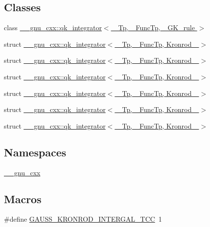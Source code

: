 \subsection*{Classes}
\begin{DoxyCompactItemize}
\item 
class \hyperlink{class____gnu__cxx_1_1qk__integrator}{\+\_\+\+\_\+gnu\+\_\+cxx\+::qk\+\_\+integrator$<$ \+\_\+\+Tp, \+\_\+\+Func\+Tp, \+\_\+\+G\+K\+\_\+rule $>$}
\item 
struct \hyperlink{struct____gnu__cxx_1_1qk__integrator_3_01__Tp_00_01__FuncTp_00_01Kronrod__15_01_4}{\+\_\+\+\_\+gnu\+\_\+cxx\+::qk\+\_\+integrator$<$ \+\_\+\+Tp, \+\_\+\+Func\+Tp, Kronrod\+\_ $>$}
\item 
struct \hyperlink{struct____gnu__cxx_1_1qk__integrator_3_01__Tp_00_01__FuncTp_00_01Kronrod__21_01_4}{\+\_\+\+\_\+gnu\+\_\+cxx\+::qk\+\_\+integrator$<$ \+\_\+\+Tp, \+\_\+\+Func\+Tp, Kronrod\+\_ $>$}
\item 
struct \hyperlink{struct____gnu__cxx_1_1qk__integrator_3_01__Tp_00_01__FuncTp_00_01Kronrod__31_01_4}{\+\_\+\+\_\+gnu\+\_\+cxx\+::qk\+\_\+integrator$<$ \+\_\+\+Tp, \+\_\+\+Func\+Tp, Kronrod\+\_ $>$}
\item 
struct \hyperlink{struct____gnu__cxx_1_1qk__integrator_3_01__Tp_00_01__FuncTp_00_01Kronrod__41_01_4}{\+\_\+\+\_\+gnu\+\_\+cxx\+::qk\+\_\+integrator$<$ \+\_\+\+Tp, \+\_\+\+Func\+Tp, Kronrod\+\_ $>$}
\item 
struct \hyperlink{struct____gnu__cxx_1_1qk__integrator_3_01__Tp_00_01__FuncTp_00_01Kronrod__51_01_4}{\+\_\+\+\_\+gnu\+\_\+cxx\+::qk\+\_\+integrator$<$ \+\_\+\+Tp, \+\_\+\+Func\+Tp, Kronrod\+\_ $>$}
\item 
struct \hyperlink{struct____gnu__cxx_1_1qk__integrator_3_01__Tp_00_01__FuncTp_00_01Kronrod__61_01_4}{\+\_\+\+\_\+gnu\+\_\+cxx\+::qk\+\_\+integrator$<$ \+\_\+\+Tp, \+\_\+\+Func\+Tp, Kronrod\+\_ $>$}
\end{DoxyCompactItemize}
\subsection*{Namespaces}
\begin{DoxyCompactItemize}
\item 
 \hyperlink{namespace____gnu__cxx}{\+\_\+\+\_\+gnu\+\_\+cxx}
\end{DoxyCompactItemize}
\subsection*{Macros}
\begin{DoxyCompactItemize}
\item 
\#define \hyperlink{gauss__kronrod__integral_8tcc_aa9eb111a71ca7ff9b6e4a1136a08c8a2}{G\+A\+U\+S\+S\+\_\+\+K\+R\+O\+N\+R\+O\+D\+\_\+\+I\+N\+T\+E\+R\+G\+A\+L\+\_\+\+T\+CC}~1
\end{DoxyCompactItemize}
